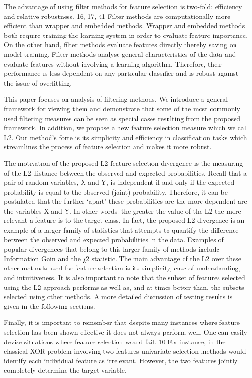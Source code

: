 \documentclass[review]{elsarticle}
\begin{document}
The advantage of using filter methods for feature selection is two-fold: efficiency and relative robustness. 16, 17, 41   Filter methods are computationally more efficient than wrapper and embedded methods. Wrapper and embedded methods both require training the learning system in order to evaluate feature importance. On the other hand, filter methods evaluate features directly thereby saving on model training. Filter methods analyse general characteristics of the data and evaluate features without involving a learning algorithm. Therefore, their performance is less dependent on any particular classifier and is robust against the issue of overfitting. 

This paper focuses on analysis of filtering methods. We introduce a general framework for viewing them and demonstrate that some of the most commonly used filtering measures can be seen as special cases resulting from the proposed framework. In addition, we propose a new feature selection measure which we call L2. Our method’s forte is its simplicity and efficiency in classification tasks which streamlines the process of feature selection and makes it more robust. 

The motivation of the proposed L2 feature selection divergence is the measuring of the L2 distance between the observed and expected probabilities. Recall that a pair of random variables, X and Y, is independent if and only if the expected probability is equal to the observed (joint) probability. Therefore, it can be postulated that the further ‘apart’ these probabilities are the more dependent are the variables X and Y. In other words, the greater the value of the L2 the more relevant a feature is to the target class. In fact, the proposed L2 divergence is an example of a larger family of statistics that attempts to quantify the difference between the observed and expected probabilities in the data. Examples of popular divergences that belong to this larger family of methods include Information Gain and the χ2 statistic. The main advantage of the L2 over these other methods used for feature selection is its simplicity, ease of understanding, and intuitiveness. It is also important to note that the subset of features selected using the L2 approach performs as well as, and at times better than, the subsets selected using other methods. A more detailed discussion of testing results is given in the following sections. 

Finally, it is important to remember that despite many instances where feature selection has been shown effective it does not always perform well. One can easily devise situations where feature selection would fail. 10  For instance, in the classical XOR problem involving two features univariate selection methods would identify each individual feature as irrelevant. However, the two features jointly completely determine the target variable. 
\end{document}

